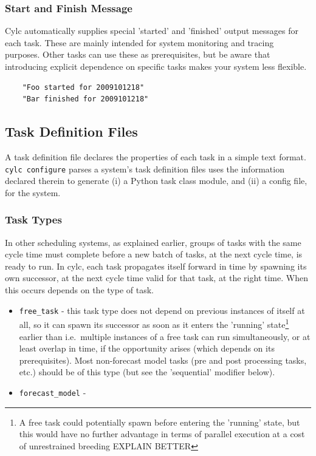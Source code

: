\documentclass[11pt,a4paper]{article}
\begin{document}
\subsubsection{Start and Finish Message}

Cylc automatically supplies special 'started' and 'finished' output
messages for each task. These are mainly intended for system monitoring
and tracing purposes. Other tasks can use these as prerequisites, but be
aware that introducing explicit dependence on specific tasks makes your
system less flexible.

\begin{lstlisting}
    "Foo started for 2009101218"
    "Bar finished for 2009101218"
\end{lstlisting}


\pagebreak
\label{sec:taskdef}
\subsection{Task Definition Files}

A task definition file declares the properties of each task in a simple
text format.  \lstinline=cylc configure= parses a system's task definition
files uses the information declared therein to generate (i) a Python
task class module, and (ii) a config file, for the system.

\label{sec:tasktype}
\subsubsection{Task Types}

In other scheduling systems, as explained earlier, groups of tasks with
the same cycle time must complete before a new batch of tasks, at the
next cycle time, is ready to run. In cylc, each task propagates itself
forward in time by spawning its own successor, at the next cycle time 
valid for that task, at the right time. When this occurs depends on the
type of task. 

\begin{itemize}
    \item \lstinline=free_task= - this task type does not depend on
        previous instances of itself at all, so it can spawn its
        successor as soon as it enters the 'running'
        state\footnote{A free task could potentially spawn before
        entering the 'running' state, but this would have no further
        advantage in terms of parallel execution at a cost of
        unrestrained breeding EXPLAIN BETTER} earlier than
        i.e.\ multiple instances of a free task can run simultaneously,
        or at least overlap in time, if the opportunity arises (which
        depends on its prerequisites). Most non-forecast model tasks
        (pre and post processing tasks, etc.) should be of this type
        (but see the 'sequential' modifier below).    

    \item \lstinline=forecast_model= - 
\end{itemize}
\end{document}
